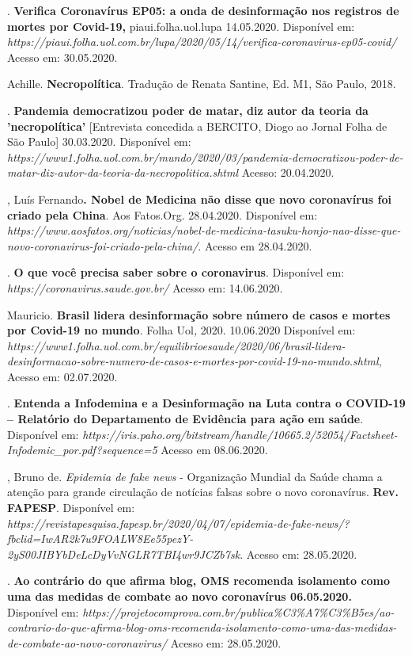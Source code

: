 \begin{bibliohedra}
. \textbf{Verifica Coronavírus EP05: a onda de desinformação nos
registros de mortes por Covid-19,} piaui.folha.uol.lupa 14.05.2020.
Disponível em:
\emph{https://piaui.folha.uol.com.br/lupa/2020/05/14/verifica-coronavirus-ep05-covid/}
Acesso em: 30.05.2020.

 Achille. \textbf{Necropolítica}. Tradução de Renata Santine, Ed.
M1, São Paulo, 2018.

\titidem. \textbf{Pandemia democratizou poder de matar, diz autor
da teoria da 'necropolítica'} {[}Entrevista concedida a BERCITO, Diogo
ao Jornal Folha de São Paulo{]} 30.03.2020. Disponível em:
\emph{https://www1.folha.uol.com.br/mundo/2020/03/pandemia-democratizou-poder-de-matar-diz-autor-da-teoria-da-necropolitica.shtml}
Acesso: 20.04.2020.

, Luís Fernando\textbf{. Nobel de Medicina não disse que novo
coronavírus foi criado pela China}. Aos Fatos.Org. 28.04.2020.
Disponível em:
\emph{https://www.aosfatos.org/noticias/nobel-de-medicina-tasuku-honjo-nao-disse-que-novo-coronavirus-foi-criado-pela-china/}.
Acesso em 28.04.2020.

. \textbf{O que você precisa saber sobre o
coronavirus}. Disponível em:
\emph{https://coronavirus.saude.gov.br/}
Acesso em: 14.06.2020.

 Mauricio. \textbf{Brasil lidera desinformação sobre número de
casos e mortes por Covid-19 no mundo}. Folha Uol\emph{,} 2020.
10.06.2020 Disponível em:
\emph{https://www1.folha.uol.com.br/equilibrioesaude/2020/06/brasil-lidera-desinformacao-sobre-numero-de-casos-e-mortes-por-covid-19-no-mundo.shtml},
Acesso em: 02.07.2020.

. \textbf{Entenda a Infodemina e a Desinformação na Luta
contra o COVID-19 -- Relatório do Departamento de Evidência para ação em
saúde}. Disponível em:
\emph{https://iris.paho.org/bitstream/handle/10665.2/52054/Factsheet-Infodemic\_por.pdf?sequence=5}
Acesso em 08.06.2020.

, Bruno de.
\emph{Epidemia de fake news} - Organização Mundial da Saúde chama a
atenção para grande circulação de notícias falsas sobre o novo
coronavírus. \textbf{Rev. FAPESP}. Disponível em:
\emph{https://revistapesquisa.fapesp.br/2020/04/07/epidemia-de-fake-news/?fbclid=IwAR2k7u9FOALW8Ee55pezY-2yS00JIBYbDeLcDyVvNGLR7TBI4wr9JCZb7sk}.
Acesso em: 28.05.2020.

.
\textbf{Ao contrário do que afirma blog, OMS recomenda isolamento como uma das
medidas de combate ao novo coronavírus 06.05.2020.} Disponível em:
\emph{https://projetocomprova.com.br/publica\%C3\%A7\%C3\%B5es/ao-contrario-do-que-afirma-blog-oms-recomenda-isolamento-como-uma-das-medidas-de-combate-ao-novo-coronavirus/}
Acesso em: 28.05.2020.


\end{bibliohedra}
